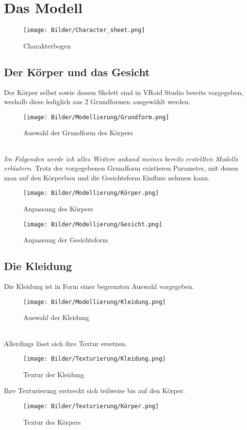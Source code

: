 \documentclass[a4paper, 12pt]{article}
\begin{document}
\section{Das Modell}
\label{sec:model}
\begin{figure}[htbp]
    \centering
    \texttt{[image: Bilder/Character\_sheet.png]}
    \caption{Charakterbogen}
\end{figure}

\subsection{Der Körper und das Gesicht}
\label{subsec:body}
Der Körper selbst sowie dessen Skelett
sind in VRoid Studio\cite{vroid-studio} bereits vorgegeben,
weshalb diese lediglich aus 2 Grundformen ausgewählt werden.
\begin{figure}[htbp]
    \centering
    \texttt{[image: Bilder/Modellierung/Grundform.png]}
    \caption{Auswahl der Grundform des Körpers}
\end{figure}
\\\textit{Im Folgenden werde ich alles Weitere anhand meines bereits erstellten Modells erläutern.}
\newpage
Trotz der vorgegebenen Grundform existieren Parameter,
mit denen man auf den Körperbau und die Gesichtsform Einfluss nehmen kann.
\begin{figure}[htbp]
    \centering
    \texttt{[image: Bilder/Modellierung/Körper.png]}
    \caption{Anpassung des Körpers}
\end{figure}
\begin{figure}[htbp]
    \centering
    \texttt{[image: Bilder/Modellierung/Gesicht.png]}
    \caption{Anpassung der Gesichtsform}
\end{figure}
\newpage

\subsection{Die Kleidung}
\label{subsec:clothes}
Die Kleidung ist in Form einer begrenzten Auswahl vorgegeben.
\begin{figure}[htbp]
    \centering
    \texttt{[image: Bilder/Modellierung/Kleidung.png]}
    \caption{Auswahl der Kleidung}
\end{figure}
\\Allerdings lässt sich ihre Textur ersetzen.
\begin{figure}[htbp]
    \centering
    \texttt{[image: Bilder/Texturierung/Kleidung.png]}
    \caption{Textur der Kleidung}
\end{figure}
\newpage
Ihre Texturierung erstreckt sich teilweise bis auf den Körper.
\begin{figure}[htbp]
    \centering
    \texttt{[image: Bilder/Texturierung/Körper.png]}
    \caption{Textur des Körpers}
\end{figure}
\newpage
\end{document}
